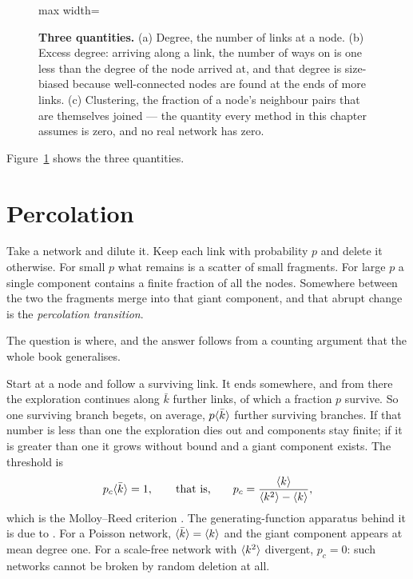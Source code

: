 \begin{figure}[t]
\begin{adjustbox}{max width=\linewidth}
\end{adjustbox}
\caption{\textbf{Three quantities.} (a) Degree, the number of links at a node.
(b) Excess degree: arriving along a link, the number of ways on is one less than
the degree of the node arrived at, and that degree is size-biased because
well-connected nodes are found at the ends of more links. (c) Clustering, the
fraction of a node's neighbour pairs that are themselves joined --- the
quantity every method in this chapter assumes is zero, and no real network has
zero.}
\label{fig:basics}
\end{figure}

Figure~\ref{fig:basics} shows the three quantities.

\section{Percolation}
\label{sec:percolation-intro}

Take a network and dilute it. Keep each link with probability $p$ and delete it
otherwise. For small $p$ what remains is a scatter of small fragments.
For large $p$ a single component contains a finite fraction of all the nodes.
Somewhere between the two the fragments merge into that giant component, and
that abrupt change is the \emph{percolation transition}.

The question is where, and the answer follows from a counting argument that the
whole book generalises.

Start at a node and follow a surviving link. It ends somewhere, and from there
the exploration continues along $\bar k$ further links, of which a fraction $p$
survive. So one surviving branch begets, on average, $p\langle \bar k \rangle$ further
surviving branches. If that number is less than one the exploration dies out and
components stay finite; if it is greater than one it grows without bound and a
giant component exists. The threshold is
\begin{equation}
  p_{c}\langle \bar k \rangle=1,
  \qquad\text{that is,}\qquad
  p_{c}=\frac{\langle k \rangle}{\langle k^{2} \rangle-\langle k \rangle},
  \label{eq:molloyreed}
\end{equation}
which is the Molloy--Reed criterion \citep{molloy1995}. The generating-function
apparatus behind it is due to \citet{newman2001random}. For a Poisson network,
$\langle \bar k \rangle=\langle k \rangle$ and the giant component appears at mean degree one. For a
scale-free network with $\langle k^{2} \rangle$ divergent, $p_{c}=0$: such networks cannot
be broken by random deletion at all.

